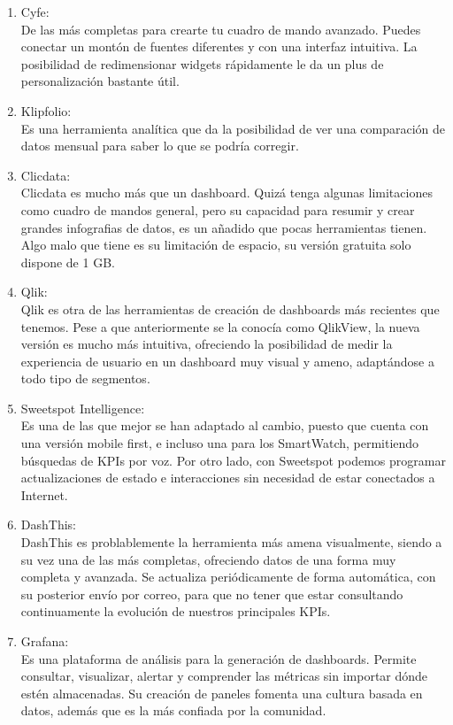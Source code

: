 \documentclass[ spanish, a4paper, 12pt, oneside]{report}
\begin{document}
\begin{enumerate}
   \item Cyfe: \\
   De las más completas para crearte tu cuadro de mando avanzado. Puedes conectar un montón de fuentes diferentes y con una interfaz intuitiva. La posibilidad de redimensionar widgets rápidamente le da un plus de personalización bastante útil. 
   \item Klipfolio: \\
   Es una herramienta analítica que da la posibilidad de ver una comparación de datos mensual para saber lo que se podría corregir.
   \item Clicdata: \\
   Clicdata es mucho más que un dashboard. Quizá tenga algunas limitaciones como cuadro de mandos general, pero su capacidad para resumir y crear grandes infografias de datos, es un añadido que pocas herramientas tienen. Algo malo que tiene es su limitación de espacio, su versión gratuita solo dispone de 1 GB.
   \item Qlik: \\
   Qlik es otra de las herramientas de creación de dashboards más recientes que tenemos. Pese a que anteriormente se la conocía como QlikView, la nueva versión es mucho más intuitiva, ofreciendo la posibilidad de medir la experiencia de usuario en un dashboard muy visual y ameno, adaptándose a todo tipo de segmentos.
   \item Sweetspot Intelligence: \\
   Es una de las que mejor se han adaptado al cambio, puesto que cuenta con una versión mobile first, e incluso una para los SmartWatch, permitiendo búsquedas de KPIs por voz. 
   Por otro lado, con Sweetspot podemos programar actualizaciones de estado e interacciones sin necesidad de estar conectados a Internet.
   \item DashThis: \\
   DashThis es problablemente la herramienta más amena visualmente, siendo a su vez una de las más completas, ofreciendo datos de una forma muy completa y avanzada.
   Se actualiza periódicamente de forma automática, con su posterior envío por correo, para que no tener que estar consultando continuamente la evolución de nuestros principales KPIs.
   \item Grafana: \\
   Es una plataforma de análisis para la generación de dashboards. Permite consultar, visualizar, alertar y comprender las métricas sin importar dónde estén almacenadas. Su creación de paneles fomenta una cultura basada en datos, además que es la más confiada por la comunidad.
\end{enumerate}
\end{document}
